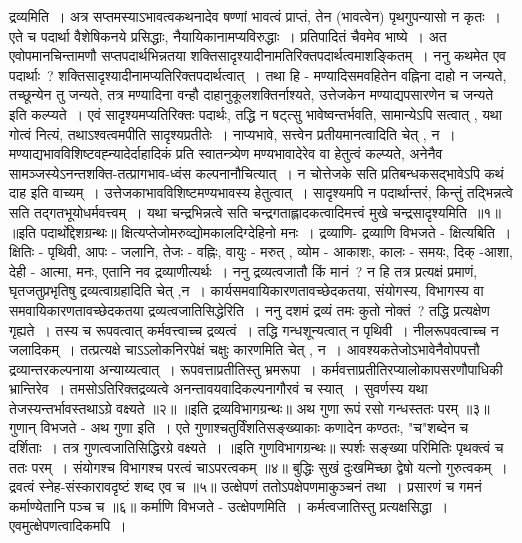द्रव्यमिति~। अत्र सप्तमस्याऽभावत्वकथनादेव षण्णां भावत्वं प्राप्तं, तेन (भावत्वेन) पृथगुपन्यासो न कृतः~। एते च पदार्था वैशेषिकनये प्रसिद्धाः, नैयायिकानामप्यविरुद्धाः~।
प्रतिपादितं चैवमेव भाष्ये~। अत एवोपमानचिन्तामणौ सप्तपदार्थभिन्नतया शक्तिसादृश्यादीनामतिरिक्तपदार्थत्वमाशङ्कितम्~।
ननु कथमेत एव पदार्थाः~? शक्तिसादृश्यादीनामप्यतिरिक्तपदार्थत्वात्~। तथा हि - मण्यादिसमवहितेन वह्निना दाहो न जन्यते, तच्छून्येन तु जन्यते, तत्र मण्यादिना
वन्हौ दाहानुकूलशक्तिर्नाश्यते, उत्तेजकेन मण्याद्यपसारणेन च जन्यते इति कल्प्यते~। एवं सादृश्यमप्यतिरिक्तः पदार्थः, तद्धि न षट्त्सु भावेष्वन्तर्भवति, सामान्येऽपि
सत्वात् , यथा गोत्वं नित्यं, तथाऽश्वत्वमपीति सादृश्यप्रतीतेः~। नाप्यभावे, सत्त्वेन प्रतीयमानत्वादिति चेत् , न~। मण्याद्यभावविशिष्टवह्न्यादेर्दाहादिकं प्रति स्वातन्त्र्येण
मण्यभावादेरेव वा हेतुत्वं कल्प्यते, अनेनैव सामञ्जस्येऽनन्तशक्ति-तत्प्रागभाव-ध्वंस कल्पनानौचित्यात्~। न चोत्तेजके सति प्रतिबन्धकसद्भावेऽपि कथं दाह इति वाच्यम्~।
उत्तेजकाभावविशिष्टमण्यभावस्य हेतुत्वात्~। सादृश्यमपि न पदार्थान्तरं, किन्तुं तद्भिन्नत्वे सति तद्गतभूयोधर्मवत्त्वम्~।
यथा चन्द्रभिन्नत्वे सति चन्द्रगताह्लादकत्वादिमत्त्वं मुखे चन्द्रसादृश्यमिति~॥१॥
॥इति पदार्थोद्देशग्रन्थः॥
क्षित्यप्तेजोमरुव्द्योमकालदिग्देहिनो मनः~।
द्रव्याणि-
द्रव्याणि विभजते - क्षित्यबिति~। क्षितिः - पृथिवी, आपः - जलानि, तेजः - वह्निः, वायुः - मरुत् , व्योम - आकाशः, कालः - समयः, दिक् -आशा, देही - आत्मा, मनः, एतानि
नव द्रव्याणीत्यर्थः~।
ननु द्रव्यत्वजातौ किं मानं~? न हि तत्र प्रत्यक्षं प्रमाणं, घृतजतुप्रभृतिषु द्रव्यत्वाग्रहादिति चेत् ,न~। कार्यसमवायिकारणतावच्छेदकतया, संयोगस्य, विभागस्य वा
समवायिकारणतावच्छेदकतया द्रव्यत्वजातिसिद्धेरिति~।
ननु दशमं द्रव्यं तमः कुतो नोक्तं~? तद्धि प्रत्यक्षेण गृह्यते~। तस्य च रूपवत्वात् कर्मवत्त्वाच्च द्रव्यत्वं~। तद्धि गन्धशून्यत्वात् न पृथिवी~। नीलरूपवत्वाच्च न
जलादिकम्~। तत्प्रत्यक्षे चाऽऽलोकनिरपेक्षं चक्षुः कारणमिति चेत् ,
न~। आवश्यकतेजोऽभावेनैवोपपत्तौ द्रव्यान्तरकल्पनाया अन्याय्यत्वात्~। रूपवत्ताप्रतीतिस्तु भ्रमरूपा~। कर्मवत्ताप्रतीतिरप्यालोकापसरणौपाधिकी भ्रान्तिरेव~।
तमसोऽतिरिक्तद्रव्यत्वे अनन्तावयवादिकल्पनागौरवं च स्यात्~। सुवर्णस्य यथा तेजस्यन्तर्भावस्तथाऽग्रे वक्ष्यते ॥२॥
॥इति द्रव्यविभागग्रन्थः॥
अथ गुणा रूपं रसो गन्धस्ततः परम् ॥३॥
गुणान् विभजते - अथ गुणा इति~। एते गुणाश्चतुर्विंशतिसङ्ख्याकाः कणादेन कण्ठतः, "च"शब्देन च दर्शिताः~। तत्र गुणत्वजातिसिद्धिरग्रे वक्ष्यते~।
॥इति गुणविभागग्रन्थः॥
स्पर्शः सङ्ख्या परिमितिः पृथक्त्वं च ततः परम्~।
संयोगश्च विभागश्च परत्वं चाऽपरत्वकम् ॥४॥
बुद्धिः सुखं दुःखमिच्छा द्वेषो यत्नो गुरुत्वकम्~।
द्रवत्वं स्नेह-संस्कारावदृष्टं शब्द एव च ॥५॥
उत्क्षेपणं ततोऽपक्षेपणमाकुञ्चनं तथा~।
प्रसारणं च गमनं कर्माण्येतानि पञ्च च ॥६॥
कर्माणि विभजते - उत्क्षेपणमिति~। कर्मत्वजातिस्तु प्रत्यक्षसिद्धा~। एवमुत्क्षेपणत्वादिकमपि~।
